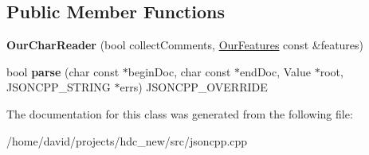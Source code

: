 \subsection*{Public Member Functions}
\begin{DoxyCompactItemize}
\item 
{\bfseries Our\+Char\+Reader} (bool collect\+Comments, \hyperlink{class_json_1_1_our_features}{Our\+Features} const \&features)\hypertarget{class_json_1_1_our_char_reader_a5015506620e7ba7bab417756fa1ca9fe}{}\label{class_json_1_1_our_char_reader_a5015506620e7ba7bab417756fa1ca9fe}

\item 
bool {\bfseries parse} (char const $\ast$begin\+Doc, char const $\ast$end\+Doc, Value $\ast$root, J\+S\+O\+N\+C\+P\+P\+\_\+\+S\+T\+R\+I\+NG $\ast$errs) J\+S\+O\+N\+C\+P\+P\+\_\+\+O\+V\+E\+R\+R\+I\+DE\hypertarget{class_json_1_1_our_char_reader_a547f08ec5a9951ca69e8bb2e90296c83}{}\label{class_json_1_1_our_char_reader_a547f08ec5a9951ca69e8bb2e90296c83}

\end{DoxyCompactItemize}


The documentation for this class was generated from the following file\+:\begin{DoxyCompactItemize}
\item 
/home/david/projects/hdc\+\_\+new/src/jsoncpp.\+cpp\end{DoxyCompactItemize}
